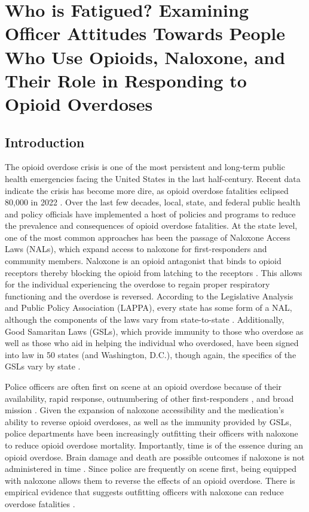 \chapter{Who is Fatigued? Examining Officer Attitudes Towards People Who Use Opioids, Naloxone, and Their Role in Responding to Opioid Overdoses}

\section{Introduction}

The opioid overdose crisis is one of the most persistent and long-term public health emergencies facing the United States in the last half-century. Recent data indicate the crisis has become more dire, as opioid overdose fatalities eclipsed 80,000 in 2022 \parencite{center_for_disease_control_and_prevention_national_2023}. Over the last few decades, local, state, and federal public health and policy officials have implemented a host of policies and programs to reduce the prevalence and consequences of opioid overdose fatalities. At the state level, one of the most common approaches has been the passage of Naloxone Access Laws (NALs), which expand access to naloxone for first-responders and community members. Naloxone is an opioid antagonist that binds to opioid receptors thereby blocking the opioid from latching to the receptors \parencite{lurigio_opioid_2018}. This allows for the individual experiencing the overdose to regain proper respiratory functioning and the overdose is reversed. According to the Legislative Analysis and Public Policy Association (LAPPA), every state has some form of a NAL, although the components of the laws vary from state-to-state \parencite{legislative_analysis_and_public_policy_association_naloxone_2022}. Additionally, Good Samaritan Laws (GSLs), which provide immunity to those who overdose as well as those who aid in helping the individual who overdosed, have been signed into law in 50 states (and Washington, D.C.), though again, the specifics of the GSLs vary by state \parencite{west_good_2023}. 

Police officers are often first on scene at an opioid overdose because of their availability, rapid response, outnumbering of other first-responders \parencite{lurigio_opioid_2018}, and broad mission \parencite{pourtaher_naloxone_2022, white_leveraging_2022}. Given the expansion of naloxone accessibility and the medication's ability to reverse opioid overdoses, as well as the immunity provided by GSLs, police departments have been increasingly outfitting their officers with naloxone \parencite{lurigio_opioid_2018, ray_national_2023} to reduce opioid overdose mortality. Importantly, time is of the essence during an opioid overdose. Brain damage and death are possible outcomes if naloxone is not administered in time \parencite{winstanley_neurocognitive_2021}. Since police are frequently on scene first, being equipped with naloxone allows them to reverse the effects of an opioid overdose. There is empirical evidence that suggests outfitting officers with naloxone can reduce overdose fatalities \parencite{rando_intranasal_2015}.

